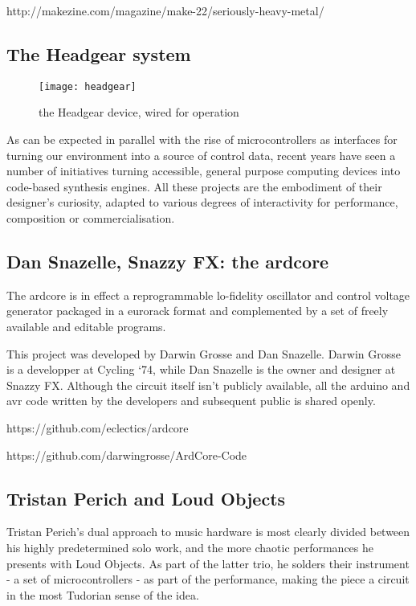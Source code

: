 http://makezine.com/magazine/make-22/seriously-heavy-metal/

\subsection{The Headgear system}

	\begin{figure}[h!]
	  \caption{the Headgear device, wired for operation}
	  \centering
	    \texttt{[image: headgear]}
	\end{figure}

As can be expected in parallel with the rise of microcontrollers as interfaces for turning our environment into a source of control data, recent years have seen a number of initiatives turning accessible, general purpose computing devices into code-based synthesis engines. All these projects are the embodiment of their designer's curiosity, adapted to various degrees of interactivity for performance, composition or commercialisation. 

\subsection{Dan Snazelle, Snazzy FX: the ardcore}

The ardcore is in effect a reprogrammable lo-fidelity oscillator and control voltage generator packaged in a eurorack format and complemented by a set of freely available and editable programs. 

This project was developed by Darwin Grosse and Dan Snazelle. Darwin Grosse is a developper at Cycling `74, while Dan Snazelle is the owner and designer at Snazzy FX. Although the circuit itself isn't publicly available, all the arduino and avr code written by the developers and subsequent public is shared openly. 

https://github.com/eclectics/ardcore

https://github.com/darwingrosse/ArdCore-Code



\subsection{Tristan Perich and Loud Objects}

Tristan Perich's dual approach to music hardware is most clearly divided between his highly predetermined solo work, and the more chaotic performances he presents with Loud Objects. As part of the latter trio, he solders their instrument - a set of microcontrollers - as part of the performance, making the piece a circuit in the most Tudorian sense of the idea. 

